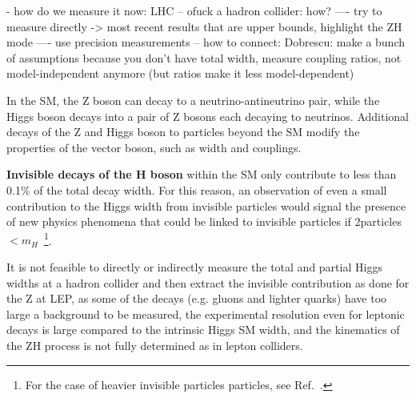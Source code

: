 - how do we measure it now: LHC 
-- ofuck a hadron collider: how?
---- try to measure directly -> most recent results that are upper bounds, highlight the ZH mode
---- use precision measurements
-- how to connect: Dobrescu: make a bunch of assumptions because you don't have total width, measure coupling ratios, not model-independent anymore (but ratios make it less model-dependent)

In the SM, the Z boson can decay to a neutrino-antineutrino pair, while the Higgs boson decays into a pair of Z bosons each decaying to neutrinos. Additional decays of the Z and Higgs boson to particles beyond the SM modify the properties of the vector boson, such as width and couplings. 


\textbf{Invisible decays of the H boson} within the SM only contribute to less than 0.1\% of the total decay width. For this reason, an observation of even a small contribution to the Higgs width from invisible particles would signal the presence of new physics phenomena that could be linked to invisible particles if 2\minvisible particles $< m_H$~\footnote{For the case of heavier invisible particles particles, see Ref.~\cite{Djouadi:2011aa}.}. 



It is not feasible to directly or indirectly measure the total and partial Higgs widths at a hadron collider and then extract the invisible contribution as done for the Z at LEP, as some of the decays (e.g. gluons and lighter quarks) have too large a background to be measured, the experimental resolution even for leptonic decays is large compared to the intrinsic Higgs SM width, and the kinematics of the ZH process is not fully determined as in lepton colliders. %


